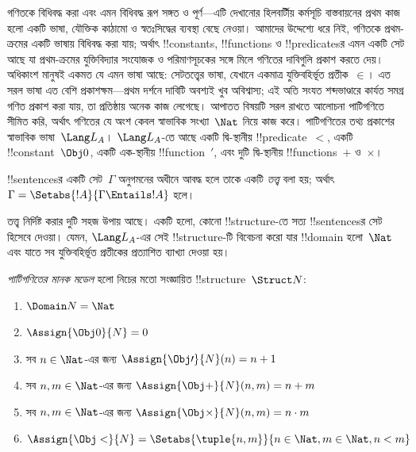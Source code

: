 \documentclass[../../../include/open-logic-section]{subfiles}
\begin{document}


গণিতকে বিধিবদ্ধ করা এবং এমন বিধিবদ্ধ রূপ সঙ্গত ও পূর্ণ—এটি দেখানোর হিলবার্টীয়
কর্মসূচি বাস্তবায়নের প্রথম কাজ হলো একটি ভাষা, যৌক্তিক কাঠামো ও স্বতঃসিদ্ধের
ব্যবস্থা বেছে নেওয়া। আমাদের উদ্দেশ্যে ধরে নিই, গণিতকে প্রথম-ক্রমের একটি ভাষায়
বিধিবদ্ধ করা যায়; অর্থাৎ !!{constant}s, !!{function}s ও !!{predicate}sর এমন
একটি সেট আছে যা প্রথম-ক্রমের যুক্তিবিদ্যার সংযোজক ও পরিমাণসূচকের সঙ্গে মিলে
গণিতের দাবিগুলি প্রকাশ করতে দেয়। অধিকাংশ মানুষই একমত যে এমন ভাষা আছে: সেটতত্ত্বের
ভাষা, যেখানে একমাত্র যুক্তিবহির্ভূত প্রতীক~$\in$। এত সরল ভাষা এত বেশি প্রকাশক্ষম—প্রথম
দর্শনে দাবিটি অবশ্যই খুব অবিশ্বাস্য; এই অতি সংযত শব্দভাণ্ডারে কার্যত সমগ্র গণিত
প্রকাশ করা যায়, তা প্রতিষ্ঠায় অনেক কাজ লেগেছে। আপাতত বিষয়টি সরল রাখতে আলোচনা
পাটিগণিতে সীমিত করি, অর্থাৎ গণিতের যে অংশ কেবল স্বাভাবিক সংখ্যা~$\Nat$ নিয়ে
কাজ করে। পাটিগণিতের তথ্য প্রকাশের স্বাভাবিক ভাষা~$\Lang L_A$। $\Lang L_A$-তে
আছে একটি দ্বি-স্থানীয় !!{predicate}~$<$, একটি !!{constant}~$\Obj 0$, একটি
এক-স্থানীয় !!{function}~$\prime$, এবং দুটি দ্বি-স্থানীয় !!{function}s~$+$
ও~$\times$।

\begin{defn}
!!{sentence}sর একটি সেট~$\Gamma$ অনুগমনের অধীনে আবদ্ধ হলে তাকে একটি
\emph{তত্ত্ব} বলা হয়; অর্থাৎ $\Gamma = \Setabs{!A}{\Gamma \Entails
!A}$ হলে।
\end{defn}

তত্ত্ব নির্দিষ্ট করার দুটি সহজ উপায় আছে। একটি হলো, কোনো !!{structure}-তে সত্য
!!{sentence}sর সেট হিসেবে দেওয়া। যেমন, $\Lang L_A$-এর সেই
!!{structure}-টি বিবেচনা করো যার !!{domain} হলো~$\Nat$ এবং যাতে সব যুক্তিবহির্ভূত
প্রতীকের প্রত্যাশিত ব্যাখ্যা দেওয়া হয়।

\begin{defn}
\emph{পাটিগণিতের মানক মডেল} হলো নিচের মতো সংজ্ঞায়িত !!{structure}~$\Struct
N$:
\begin{enumerate}
\item $\Domain N = \Nat$
\item $\Assign{\Obj 0}{N} = 0$
\item সব $n \in \Nat$-এর জন্য $\Assign{\Obj \prime}{N}(n) = n + 1$
\item সব $n, m \in \Nat$-এর জন্য $\Assign{\Obj +}{N}(n, m) = n + m$
\item সব $n, m \in \Nat$-এর জন্য $\Assign{\Obj \times}{N}(n, m) = n\cdot m$
\item $\Assign{\Obj <}{N} = \Setabs{\tuple{n, m}}{n \in \Nat, m \in
  \Nat, n < m}$
\end{enumerate}
\end{defn}
\end{document}
